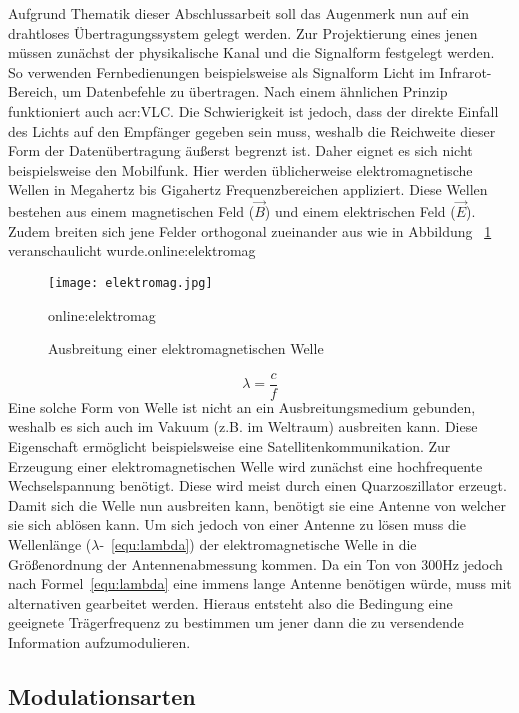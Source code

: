 Aufgrund Thematik dieser Abschlussarbeit soll das Augenmerk nun auf ein drahtloses Übertragungssystem gelegt werden. Zur Projektierung eines jenen müssen zunächst der physikalische Kanal und die Signalform festgelegt werden.
So verwenden Fernbedienungen beispielsweise als Signalform Licht im Infrarot-Bereich, um Datenbefehle zu übertragen. Nach einem ähnlichen Prinzip funktioniert auch \gls{acr:VLC}. Die Schwierigkeit ist jedoch, dass der direkte Einfall des Lichts auf den Empfänger gegeben sein muss, weshalb die Reichweite dieser Form der Datenübertragung äußerst begrenzt ist. Daher eignet es sich nicht beispielsweise den Mobilfunk. Hier werden üblicherweise elektromagnetische Wellen in Megahertz bis Gigahertz Frequenzbereichen appliziert. Diese Wellen bestehen aus einem magnetischen Feld ($\vec{B}$) und einem elektrischen Feld ($\vec{E}$). Zudem breiten sich jene Felder orthogonal zueinander aus wie in Abbildung ~\ref{fig:elektromag} veranschaulicht wurde.\gls{online:elektromag} 

\begin{figure}[H]
	\centering
	\texttt{[image: elektromag.jpg]}
	\caption[Ausbreitung einer elektromagnetischen Welle]{Ausbreitung einer elektromagnetischen Welle} 
	\gls{online:elektromag}
	\label{fig:elektromag}
\end{figure}
\begin{equation}
	\label{equ:lambda}
	\lambda = \frac{c}{f} 
\end{equation}
Eine solche Form von Welle ist nicht an ein Ausbreitungsmedium gebunden, weshalb es sich auch im Vakuum (z.B. im Weltraum) ausbreiten kann. Diese Eigenschaft ermöglicht beispielsweise eine Satellitenkommunikation. Zur Erzeugung einer elektromagnetischen Welle wird zunächst eine hochfrequente Wechselspannung benötigt. Diese wird meist durch einen Quarzoszillator erzeugt. Damit sich die Welle nun ausbreiten kann, benötigt sie eine Antenne von welcher sie sich ablösen kann.\cite{howwireless}\cite{wernerNachrichtentechnikEinfuehrungFuer2010} Um sich jedoch von einer Antenne zu lösen muss die Wellenlänge ($\lambda$-~\ref{equ:lambda}) der elektromagnetische Welle in die Größenordnung der Antennenabmessung kommen. Da ein Ton von 300Hz jedoch nach Formel~\ref{equ:lambda} eine immens lange Antenne benötigen würde, muss mit alternativen gearbeitet werden. Hieraus entsteht also die Bedingung eine geeignete Trägerfrequenz zu bestimmen um jener dann die zu versendende Information aufzumodulieren.\cite{hftech}\cite{hoeher}
\subsection{Modulationsarten}
\label{subsec:modulationsarten}

